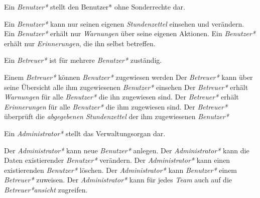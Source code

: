 \begin{requirements}
    Ein \emph{Benutzer*} stellt den Benutzer* ohne Sonderrechte dar.
    \begin{requirements}
         Ein \emph{Benutzer*} kann nur seinen eigenen \emph{Stundenzettel} einsehen und verändern.
         Ein \emph{Benutzer*} erhält nur \emph{Warnungen} über seine eigenen Aktionen.
         Ein \emph{Benutzer*} erhält nur \emph{Erinnerungen}, die ihn selbst betreffen.
    \end{requirements}

        Ein \emph{Betreuer*} ist für mehrere \emph{Benutzer*} zuständig.
        \begin{requirements}
             Einem \emph{Betreuer*} können \emph{Benutzer*} zugewiesen werden
             Der \emph{Betreuer*} kann über seine Übersicht alle ihm zugewiesenen \emph{Benutzer*} einsehen
             Der \emph{Betreuer*} erhält \emph{Warnungen} für alle \emph{Benutzer*} die ihn zugewiesen sind.
             Der \emph{Betreuer*} erhält \emph{Erinnerungen} für alle \emph{Benutzer*} die ihm zugewiesen sind.
             Der \emph{Betreuer*} überprüft die \emph{abgegebenen Stundenzettel} der ihm zugewiesenen \emph{Benutzer*}
        \end{requirements}

        Ein \emph{Administrator*} stellt das Verwaltungsorgan dar.
        \begin{requirements}
             Der \emph{Administrator*} kann neue \emph{Benutzer*} anlegen.
             Der \emph{Administrator*} kann die Daten existierender \emph{Benutzer*} verändern.
             Der \emph{Administrator*} kann einen existierenden \emph{Benutzer*} löschen.
             Der \emph{Administrator*} kann \emph{Benutzer*} einem \emph{Betreuer*} zuweisen.
             Der \emph{Administrator*} kann für jedes \emph{Team} auch auf die \emph{Betreuer*ansicht} zugreifen.
        \end{requirements}
\end{requirements}


